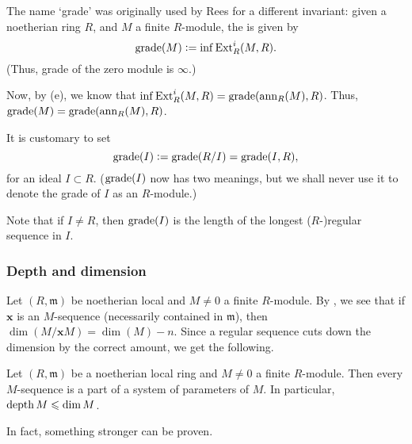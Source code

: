 \documentclass[12pt]{article}
\begin{document}
\begin{rem}
	The name `grade' was originally used by Rees for a different invariant: given a noetherian ring $R$, and $M$ a finite $R$-module, the  is given by
	\begin{equation*} 
		\operatorname{grade}(M) \vcentcolon= \inf \operatorname{Ext}_{R}^{i}(M, R).
	\end{equation*}
	(Thus, grade of the zero module is $\infty$.)

	Now, by  (e), we know that $\inf \operatorname{Ext}_{R}^{i}(M, R) = \operatorname{grade}(\operatorname{ann}_{R}(M), R)$. Thus, $\operatorname{grade}(M) = \operatorname{grade}(\operatorname{ann}_{R}(M), R)$. 

	It is customary to set
	\begin{equation*} 
		\operatorname{grade}(I) \vcentcolon= \operatorname{grade}(R/I) = \operatorname{grade}(I, R),
	\end{equation*}
	for an ideal $I \subset R$. ($\operatorname{grade}(I)$ now has two meanings, but we shall never use it to denote the grade of $I$ as an $R$-module.)

	Note that if $I \neq R$, then $\operatorname{grade}(I)$ is the length of the longest ($R$-)regular sequence in $I$.
\end{rem}

\subsubsection{Depth and dimension} 

Let $(R, \mathfrak{m})$ be noetherian local and $M \neq 0$ a finite $R$-module. By , we see that if $\mathbf{x}$ is an $M$-sequence (necessarily contained in $\mathfrak{m}$), then $\dim(M/\mathbf{x} M) = \dim(M) - n$. Since a regular sequence cuts down the dimension by the correct amount, we get the following.

\begin{prop} \label{prop:depth-le-dim}
	Let $(R, \mathfrak{m})$ be a noetherian local ring and $M \neq 0$ a finite $R$-module. Then every $M$-sequence is a part of a system of parameters of $M$. In particular, $\operatorname{depth} M \leqslant \dim M$.
\end{prop}

In fact, something stronger can be proven.
\end{document}
